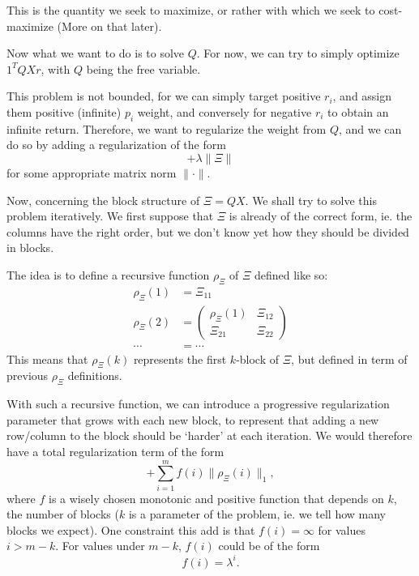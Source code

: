 This is the quantity we seek to maximize, or rather with which we seek to cost-maximize
(More on that later).

\starsection

Now what we want to do is to solve $Q$. For now, we can try to simply optimize $1^TQXr$,
with $Q$ being the free variable. 

This problem is not bounded, for we can simply target positive $r_i$, and assign them
positive (infinite) $p_i$ weight, and conversely for negative $r_i$ to obtain an infinite
return. Therefore, we want to regularize the weight from $Q$, and we can do so by adding a
regularization of the form
\begin{equation}
  +\lambda \|\Xi\|
\end{equation}
for some appropriate matrix norm $\|\cdot\|$.

Now, concerning the block structure of $\Xi=QX$. We shall try to solve this problem
iteratively. We first suppose that $\Xi$ is already of the correct form, ie. the columns
have the right order, but we don't know yet how they should be divided in blocks. 

The idea is to define a recursive function $\rho_\Xi$ of $\Xi$ defined like so:
\begin{align}
  \rho_\Xi(1) &= \Xi_{11}\\
  \rho_\Xi(2) &= \begin{pmatrix}\rho_\Xi(1) & \Xi_{12}\\ \Xi_{21} &
    \Xi_{22}\end{pmatrix}\\
  \cdots &= \cdots
\end{align}
This means that $\rho_\Xi(k)$ represents the first $k$-block of $\Xi$, but defined in term
of previous $\rho_\Xi$ definitions. 

With such a recursive function, we can introduce a progressive regularization parameter
that grows with each new block, to represent that adding a new row/column to the block
should be `harder' at each iteration. We would therefore have a total regularization term
of the form
\begin{equation}
  +\sum_{i=1}^m f(i) \|\rho_\Xi(i)\|_1,
\end{equation}
where $f$ is a wisely chosen monotonic and positive function that depends on $k$, the
number of blocks ($k$ is a parameter of the problem, ie. we tell how many blocks we
expect). One constraint this add is that $f(i)=\infty$ for values $i>m-k$. For values
under $m-k$, $f(i)$ could be of the form
\begin{equation}
  f(i) = \lambda^i.
\end{equation}
